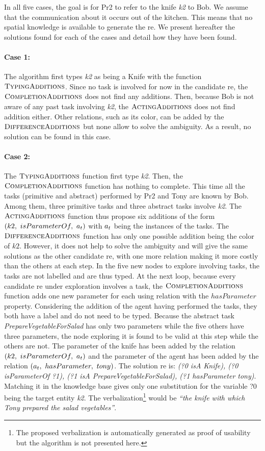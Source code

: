 In all five cases, the goal is for Pr2 to refer to the knife \textit{k2} to Bob. We assume that the communication about it occurs out of the kitchen. This means that no spatial knowledge is available to generate the \acrshort{re}. We present hereafter the solutions found for each of the cases and detail how they have been found.

\paragraph{Case 1:} The algorithm first types \textit{k2} as being a Knife with the function $\textsc{TypingAdditions}$.
Since no task is involved for now in the candidate \acrshort{re}, the $\textsc{CompletionAdditions}$ does not find any additions. Then, because Bob is not aware of any past task involving \textit{k2}, the $\textsc{ActingAdditions}$ does not find addition either. Other relations, such as its color, can be added by the $\textsc{DifferenceAdditions}$ but none allow to solve the ambiguity. As a result, no solution can be found in this case.

\paragraph{Case 2:} The $\textsc{TypingAdditions}$ function first type \textit{k2}. Then, the $\textsc{CompletionAdditions}$ function has nothing to complete. This time all the tasks (primitive and abstract) performed by Pr2 and Tony are known by Bob. Among them, three primitive tasks and three abstract tasks involve \textit{k2}. The $\textsc{ActingAdditions}$ function thus propose six additions of the form $(k2,\ isParameterOf,\ \indiv_t)$ with $a_t$ being the instances of the tasks. The $\textsc{DifferenceAdditions}$ function has only one possible addition being the color of $k2$. However, it does not help to solve the ambiguity and will give the same solutions as the other candidate \acrshort{re}, with one more relation making it more costly than the others at each step. In the five new nodes to explore involving tasks, the tasks are not labelled and are thus typed. At the next loop, because every candidate \acrshort{re} under exploration involves a task, the $\textsc{CompletionAdditions}$ function adds one new parameter for each using relation with the $hasParameter$ property. Considering the addition of the agent having performed the tasks, they both have a label and do not need to be typed. Because the abstract task \textit{PrepareVegetableForSalad} has only two parameters while the five others have three parameters, the node exploring it is found to be valid at this step while the others are not. The parameter of the knife has been added by the relation $(k2,\ isParameterOf,\ \indiv_t)$ and the parameter of the agent has been added by the relation $(a_t,\ hasParameter,\ tony)$. The solution \acrshort{re} is: \textit{(?0 isA Knife), (?0 isParameterOf ?1), (?1 isA PrepareVegetableForSalad), (?1 hasParameter tony)}. Matching it in the knowledge base gives only one substitution for the variable ?0 being the target entity \textit{k2}. The verbalization\footnote{The proposed verbalization is automatically generated as proof of usability but the algorithm is not presented here.} would be \textit{``the knife with which Tony prepared the salad vegetables''}.

